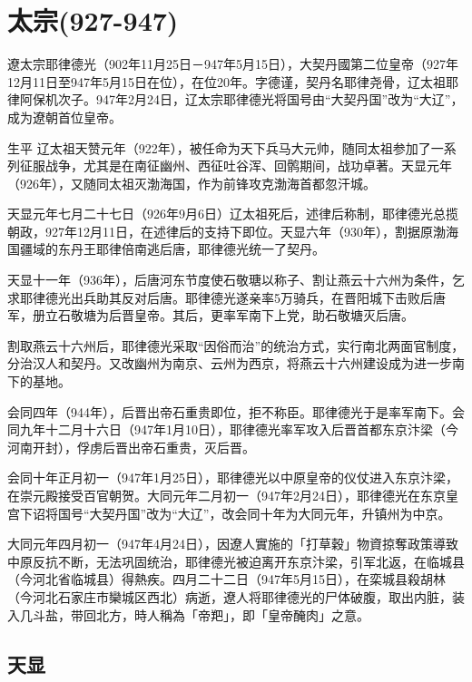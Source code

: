 
\section{太宗\tiny(927-947)}

遼太宗耶律德光（902年11月25日－947年5月15日），大契丹國第二位皇帝（927年12月11日至947年5月15日在位），在位20年。字德谨，契丹名耶律尧骨，辽太祖耶律阿保机次子。947年2月24日，辽太宗耶律德光将国号由“大契丹国”改为“大辽”，成为遼朝首位皇帝。

生平
辽太祖天赞元年（922年），被任命为天下兵马大元帅，随同太祖参加了一系列征服战争，尤其是在南征幽州、西征吐谷浑、回鹘期间，战功卓著。天显元年（926年），又随同太祖灭渤海国，作为前锋攻克渤海首都忽汗城。

天显元年七月二十七日（926年9月6日）辽太祖死后，述律后称制，耶律德光总揽朝政，927年12月11日，在述律后的支持下即位。天显六年（930年），割据原渤海国疆域的东丹王耶律倍南逃后唐，耶律德光统一了契丹。

天显十一年（936年），后唐河东节度使石敬瑭以称子、割让燕云十六州为条件，乞求耶律德光出兵助其反对后唐。耶律德光遂亲率5万骑兵，在晋阳城下击败后唐军，册立石敬塘为后晋皇帝。其后，更率军南下上党，助石敬塘灭后唐。

割取燕云十六州后，耶律德光采取“因俗而治”的统治方式，实行南北两面官制度，分治汉人和契丹。又改幽州为南京、云州为西京，将燕云十六州建设成为进一步南下的基地。

会同四年（944年），后晋出帝石重贵即位，拒不称臣。耶律德光于是率军南下。会同九年十二月十六日（947年1月10日），耶律德光率军攻入后晋首都东京汴梁（今河南开封），俘虏后晋出帝石重贵，灭后晋。

会同十年正月初一（947年1月25日），耶律德光以中原皇帝的仪仗进入东京汴梁，在崇元殿接受百官朝贺。大同元年二月初一（947年2月24日），耶律德光在东京皇宫下诏将国号“大契丹国”改为“大辽”，改会同十年为大同元年，升镇州为中京。

大同元年四月初一（947年4月24日），因遼人實施的「打草穀」物資掠奪政策導致中原反抗不断，无法巩固统治，耶律德光被迫离开东京汴梁，引军北返，在临城县（今河北省临城县）得熱疾。四月二十二日（947年5月15日），在栾城县殺胡林（今河北石家庄市欒城区西北）病逝，遼人将耶律德光的尸体破腹，取出内脏，装入几斗盐，带回北方，時人稱為「帝羓」，即「皇帝醃肉」之意。

\subsection{天显}

